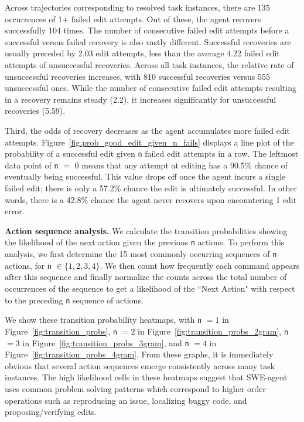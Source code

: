 Across trajectories corresponding to resolved task instances, there are \num{135} occurrences of \num{1}+ failed edit attempts.
Out of these, the agent recovers successfully \num{104} times.
The number of consecutive failed edit attempts before a successful versus failed recovery is also vastly different.
Successful recoveries are usually preceded by \num{2.03} edit attempts, less than the average \num{4.22} failed edit attempts of unsuccessful recoveries.
Across all task instances, the relative rate of unsuccessful recoveries increases, with \num{810} successful recoveries versus \num{555} unsuccessful ones.
While the number of consecutive failed edit attempts resulting in a recovery remains steady (\num{2.2}), it increases significantly for unsuccessful recoveries (\num{5.59}).

Third, the odds of recovery decreases as the agent accumulates more failed edit attempts.
Figure~\ref{fig.prob_good_edit_given_n_fails} displays a line plot of the probability of a successful edit given \texttt{n} failed edit attempts in a row.
The leftmost data point of \texttt{n} $=$ \num{0} means that any attempt at editing has a \num{90.5}\% chance of eventually being successful.
This value drops off once the agent incurs a single failed edit; there is only a \num{57.2}\% chance the edit is ultimately successful.
In other words, there is a \num{42.8}\% chance the agent never recovers upon encountering \num{1} edit error.

\textbf{Action sequence analysis.}
We calculate the transition probabilities showing the likelihood of the next action given the previous \texttt{n} actions.
To perform this analysis, we first determine the \num{15} most commonly occurring sequences of \texttt{n} actions, for \texttt{n} $\in\{1, 2, 3, 4\}$.
We then count how frequently each command appears after this sequence and finally normalize the counts across the total number of occurrences of the sequence to get a likelihood of the ``Next Action" with respect to the preceding \texttt{n} sequence of actions.

We show these transition probability heatmaps, with \texttt{n} $=1$ in Figure~\ref{fig:transition_probs}, \texttt{n} $=2$ in Figure~\ref{fig:transition_probs_2gram}, \texttt{n} $=3$ in Figure~\ref{fig:transition_probs_3gram}, and \texttt{n} $=4$ in Figure~\ref{fig:transition_probs_4gram}.
From these graphs, it is immediately obvious that several action sequences emerge consistently across many task instances.
The high likelihood cells in these heatmaps suggest that SWE-agent uses common problem solving patterns which correspond to higher order operations such as reproducing an issue, localizing buggy code, and proposing/verifying edits.

